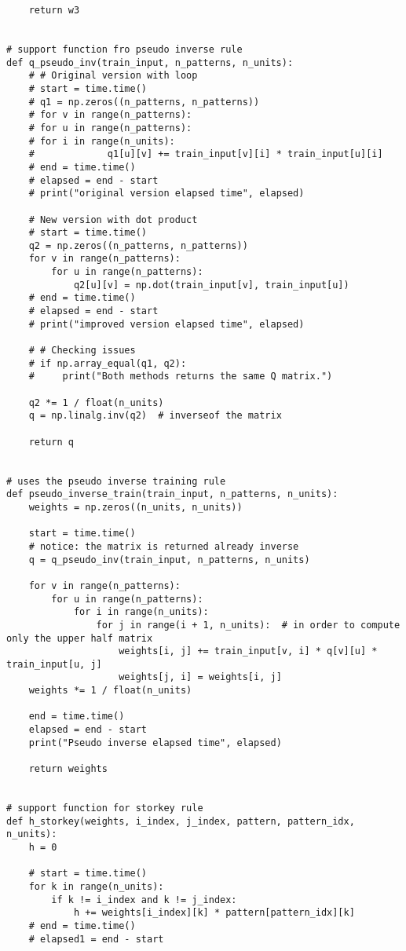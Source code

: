 \documentclass[letterpaper,twocolumn,10pt]{article}
\begin{document}
\begin{lstlisting}
    return w3


# support function fro pseudo inverse rule
def q_pseudo_inv(train_input, n_patterns, n_units):
    # # Original version with loop
    # start = time.time()
    # q1 = np.zeros((n_patterns, n_patterns))
    # for v in range(n_patterns):
    # for u in range(n_patterns):
    # for i in range(n_units):
    #             q1[u][v] += train_input[v][i] * train_input[u][i]
    # end = time.time()
    # elapsed = end - start
    # print("original version elapsed time", elapsed)

    # New version with dot product
    # start = time.time()
    q2 = np.zeros((n_patterns, n_patterns))
    for v in range(n_patterns):
        for u in range(n_patterns):
            q2[u][v] = np.dot(train_input[v], train_input[u])
    # end = time.time()
    # elapsed = end - start
    # print("improved version elapsed time", elapsed)

    # # Checking issues
    # if np.array_equal(q1, q2):
    #     print("Both methods returns the same Q matrix.")

    q2 *= 1 / float(n_units)
    q = np.linalg.inv(q2)  # inverseof the matrix

    return q


# uses the pseudo inverse training rule
def pseudo_inverse_train(train_input, n_patterns, n_units):
    weights = np.zeros((n_units, n_units))

    start = time.time()
    # notice: the matrix is returned already inverse
    q = q_pseudo_inv(train_input, n_patterns, n_units)

    for v in range(n_patterns):
        for u in range(n_patterns):
            for i in range(n_units):
                for j in range(i + 1, n_units):  # in order to compute only the upper half matrix
                    weights[i, j] += train_input[v, i] * q[v][u] * train_input[u, j]
                    weights[j, i] = weights[i, j]
    weights *= 1 / float(n_units)

    end = time.time()
    elapsed = end - start
    print("Pseudo inverse elapsed time", elapsed)

    return weights


# support function for storkey rule
def h_storkey(weights, i_index, j_index, pattern, pattern_idx, n_units):
    h = 0

    # start = time.time()
    for k in range(n_units):
        if k != i_index and k != j_index:
            h += weights[i_index][k] * pattern[pattern_idx][k]
    # end = time.time()
    # elapsed1 = end - start


\end{lstlisting}
\end{document}
